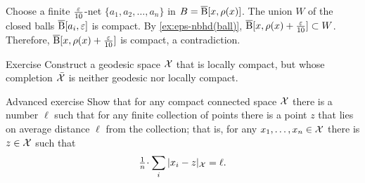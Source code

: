 Choose a finite $\tfrac{\varepsilon}{10}$-net $\{a_1,a_2,\dots,a_n\}$ in $B=\overline{\mathrm{B}}{}[x,\rho(x)]$.
The union $W$ of the closed balls $\overline{\mathrm{B}}{}[a_i,\varepsilon]$ is compact.
By \ref{ex:eps-nbhd(ball)},
$\overline{\mathrm{B}}{}[x,\rho(x)+\frac{\varepsilon}{10}]\subset W$.
Therefore, $\overline{\mathrm{B}}{}[x,\rho(x)+\frac{\varepsilon}{10}]$ is compact,
a contradiction.
\qeds

\begin{thm}{Exercise}\label{exercise from BH}
Construct a geodesic space $\mathcal{X}$ that is locally compact,
but whose completion $\bar{\mathcal{X}}$ is neither geodesic nor locally compact.
\end{thm}


\begin{thm}{Advanced exercise}\label{ex:gross}
Show that for any compact connected space $\mathcal{X}$ there is a number $\ell$ such that for any finite collection of points there is a point $z$ that lies on average distance $\ell$ from the collection;
that is, for any $x_1,\dots,x_n\in \mathcal{X}$ there is $z\in \mathcal{X}$ such that
\[\tfrac1n\cdot\sum_i|x_i-z|_{\spc{X}}=\ell.\]
\end{thm}






